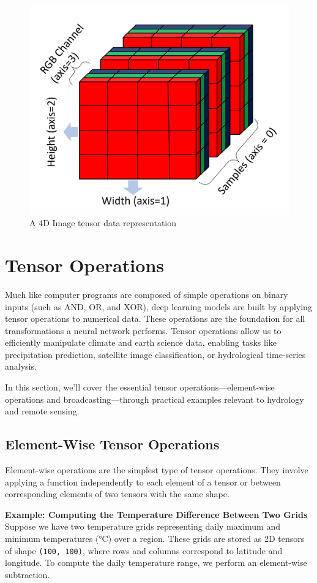 \begin{figure}
    \centering
    \includegraphics[width=0.5\linewidth]{images/4d-image-tensor.png}
    \caption{A 4D Image tensor data representation}
    \label{fig:4d-image-tensor}
\end{figure}





\section{Tensor Operations}


Much like computer programs are composed of simple operations on binary inputs (such as AND, OR, and XOR), deep learning models are built by applying tensor operations to numerical data. These operations are the foundation for all transformations a neural network performs. Tensor operations allow us to efficiently manipulate climate and earth science data, enabling tasks like precipitation prediction, satellite image classification, or hydrological time-series analysis.

In this section, we’ll cover the essential tensor operations—element-wise operations and broadcasting—through practical examples relevant to hydrology and remote sensing.

\subsection{Element-Wise Tensor Operations}

Element-wise operations are the simplest type of tensor operations. They involve applying a function independently to each element of a tensor or between corresponding elements of two tensors with the same shape.

\textbf{Example: Computing the Temperature Difference Between Two Grids}  
Suppose we have two temperature grids representing daily maximum and minimum temperatures (°C) over a region. These grids are stored as 2D tensors of shape \texttt{(100, 100)}, where rows and columns correspond to latitude and longitude. To compute the daily temperature range, we perform an element-wise subtraction.

